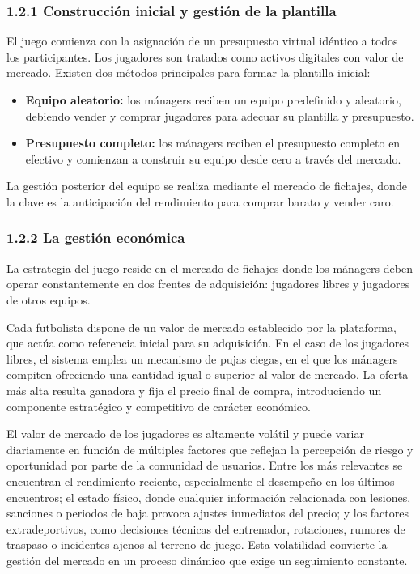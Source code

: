 \subsubsection{1.2.1 Construcción inicial y gestión de la plantilla}

El juego comienza con la asignación de un presupuesto virtual idéntico a todos los participantes.
Los jugadores son tratados como activos digitales con valor de mercado.
Existen dos métodos principales para formar la plantilla inicial:

\begin{itemize}
\item \textbf{Equipo aleatorio:} los mánagers reciben un equipo predefinido y aleatorio, debiendo 
vender y comprar jugadores para adecuar su plantilla y presupuesto.
\item \textbf{Presupuesto completo:} los mánagers reciben el presupuesto completo en efectivo y 
comienzan a construir su equipo desde cero a través del mercado.
\end{itemize}

La gestión posterior del equipo se realiza mediante el mercado de fichajes, donde la clave es la 
anticipación del rendimiento para comprar barato y vender caro.

\subsubsection{1.2.2 La gestión económica}

La estrategia del juego reside en el mercado de fichajes donde los mánagers deben operar constantemente 
en dos frentes de adquisición: jugadores libres y jugadores de otros equipos.

Cada futbolista dispone de un valor de mercado establecido por la plataforma, que actúa como referencia 
inicial para su adquisición.
En el caso de los jugadores libres, el sistema emplea un mecanismo de pujas ciegas, en el que los 
mánagers compiten ofreciendo una cantidad igual o superior al valor de mercado.
La oferta más alta resulta ganadora y fija el precio final de compra, introduciendo un componente 
estratégico y competitivo de carácter económico.

El valor de mercado de los jugadores es altamente volátil y puede variar diariamente en función de 
múltiples factores que reflejan la percepción de riesgo y oportunidad por parte de la comunidad de 
usuarios.
Entre los más relevantes se encuentran el rendimiento reciente, especialmente el desempeño en los 
últimos encuentros; el estado físico, donde cualquier información relacionada con lesiones, sanciones 
o periodos de baja provoca ajustes inmediatos del precio; y los factores extradeportivos, como 
decisiones técnicas del entrenador, rotaciones, rumores de traspaso o incidentes ajenos al terreno de 
juego.
Esta volatilidad convierte la gestión del mercado en un proceso dinámico que exige un seguimiento 
constante.

